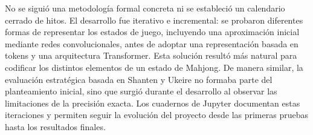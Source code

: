 No se siguió una metodología formal concreta ni se estableció un calendario cerrado de hitos. El desarrollo fue iterativo e incremental: se probaron diferentes formas de representar los estados de juego, incluyendo una aproximación inicial mediante redes convolucionales, antes de adoptar una representación basada en tokens y una arquitectura Transformer. Esta solución resultó más natural para codificar los distintos elementos de un estado de Mahjong. De manera similar, la evaluación estratégica basada en Shanten y Ukeire no formaba parte del planteamiento inicial, sino que surgió durante el desarrollo al observar las limitaciones de la precisión exacta. Los cuadernos de Jupyter documentan estas iteraciones y permiten seguir la evolución del proyecto desde las primeras pruebas hasta los resultados finales.
